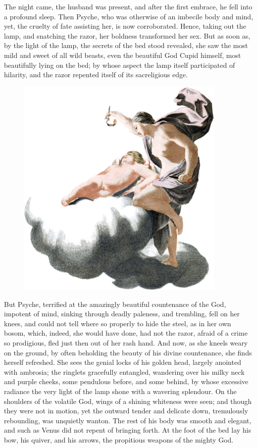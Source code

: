 \documentclass[12pt]{article}
\begin{document}
The night came, the husband was present, and after the first embrace, he fell
into a profound sleep. Then Psyche, who was otherwise of an imbecile body and
mind, yet, the cruelty of fate assisting her, is now corroborated. Hence,
taking out the lamp, and snatching the razor, her boldness transformed her sex.
But as soon as, by the light of the lamp, the secrets of the bed stood
revealed, she saw the most mild and sweet of all wild beasts, even the
beautiful God Cupid himself, most beautifully lying on the bed; by whose aspect
the lamp itself participated of hilarity, and the razor repented itself of its
sacreligious edge.

\begin{figure}
\centering
\includegraphics[width=288pt]{apuleius_cupid_and_psyche.png}
\end{figure}

But Psyche, terrified at the amazingly beautiful countenance of the God,
impotent of mind, sinking through deadly paleness, and trembling, fell on her
knees, and could not tell where so properly to hide the steel, as in her own
bosom, which, indeed, she would have done, had not the razor, afraid of a crime
so prodigious, fled just then out of her rash hand. And now, as she kneels
weary on the ground, by often beholding the beauty of his divine countenance,
she finds herself refreshed. She sees the genial locks of his golden head,
largely anointed with ambrosia; the ringlets gracefully entangled, wandering
over his milky neck and purple cheeks, some pendulous before, and some behind,
by whose excessive radiance the very light of the lamp shone with a wavering
splendour. On the shoulders of the volatile God, wings of a shining whiteness
were seen; and though they were not in motion, yet the outward tender and
delicate down, tremulously rebounding, was unquietly wanton. The rest of his
body was smooth and elegant, and such as Venus did not repent of bringing
forth. At the foot of the bed lay his bow, his quiver, and his arrows, the
propitious weapons of the mighty God.
\end{document}

